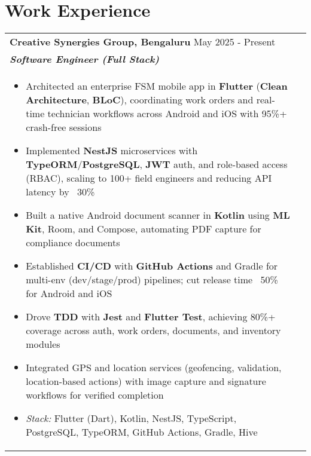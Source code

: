 \documentclass[a4paper,8pt]{article}
\begin{document}
\section{Work Experience}
\begin{tabularx}{\linewidth}{ @{}l r@{} }
\textbf{{Creative Synergies Group, Bengaluru}} \hfill \color[HTML]{371e77} May 2025 - Present \\[4pt]
\color[HTML]{371e77}\textbf{\textit{Software Engineer (Full Stack)}}\ \hfill \color[HTML]{4B28A4} \\[5pt]
\begin{minipage}[t]{\linewidth}
    \begin{itemize}[nosep,after=\strut, leftmargin=2em, itemsep=2pt]
        \item Architected an enterprise FSM mobile app in \textbf{Flutter} (\textbf{Clean Architecture}, \textbf{BLoC}), coordinating work orders and real-time technician workflows across Android and iOS with 95\%+ crash-free sessions
        \item Implemented \textbf{NestJS} microservices with \textbf{TypeORM}/\textbf{PostgreSQL}, \textbf{JWT} auth, and role-based access (RBAC), scaling to 100+ field engineers and reducing API latency by ~30\%
        \item Built a native Android document scanner in \textbf{Kotlin} using \textbf{ML Kit}, Room, and Compose, automating PDF capture for compliance documents
        \item Established \textbf{CI/CD} with \textbf{GitHub Actions} and Gradle for multi-env (dev/stage/prod) pipelines; cut release time ~50\% for Android and iOS
        \item Drove \textbf{TDD} with \textbf{Jest} and \textbf{Flutter Test}, achieving 80\%+ coverage across auth, work orders, documents, and inventory modules
        \item Integrated GPS and location services (geofencing, validation, location-based actions) with image capture and signature workflows for verified completion
        \item \textit{Stack:} Flutter (Dart), Kotlin, NestJS, TypeScript, PostgreSQL, TypeORM, GitHub Actions, Gradle, Hive
    \end{itemize}
\end{minipage}
\end{tabularx}
\end{document}
